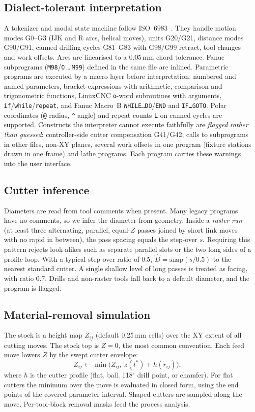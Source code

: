 \documentclass[conference]{IEEEtran}
\begin{document}
\subsection{Dialect-tolerant interpretation}
A tokenizer and modal state machine follow ISO~6983~\cite{iso6983}. They handle
motion modes G0--G3 (IJK and R arcs, helical moves), units G20/G21, distance
modes G90/G91, canned drilling cycles G81--G83 with G98/G99 retract, tool
changes and work offsets. Arcs are linearised to a 0.05\,mm chord tolerance.
Fanuc subprograms (\texttt{M98}/\texttt{O}\,\dots\,\texttt{M99}) defined in
the same file are inlined. Parametric programs are executed by a macro layer
before interpretation: numbered and named parameters, bracket expressions with
arithmetic, comparison and trigonometric functions, LinuxCNC \texttt{o}-word
subroutines with arguments, \texttt{if}/\texttt{while}/\texttt{repeat}, and
Fanuc Macro~B \texttt{WHILE\dots DO}/\texttt{END} and \texttt{IF\dots GOTO}.
Polar coordinates (\texttt{@} radius, \texttt{\^{}} angle) and repeat counts
\texttt{L} on canned cycles are supported. Constructs the interpreter cannot
execute faithfully are \emph{flagged rather than guessed}: controller-side
cutter compensation G41/G42, calls to subprograms in other files, non-XY
planes, several work offsets in one program (fixture stations drawn in one
frame) and lathe programs. Each program carries these warnings into the user
interface.

\subsection{Cutter inference}
Diameters are read from tool comments when present. Many legacy programs have
no comments, so we infer the diameter from geometry. Inside a \emph{raster run}
(at least three alternating, parallel, equal-$Z$ passes joined by short link
moves with no rapid in between), the pass spacing equals the step-over $s$.
Requiring this pattern rejects look-alikes such as separate parallel slots or
the two long sides of a profile loop. With a typical step-over ratio of 0.5,
$\hat D = \mathrm{snap}(s/0.5)$ to the nearest standard cutter. A single
shallow level of long passes is treated as facing, with ratio 0.7. Drills and
non-raster tools fall back to a default diameter, and the program is flagged.

\subsection{Material-removal simulation}
The stock is a height map $Z_{ij}$ (default 0.25\,mm cells) over the XY
extent of all cutting moves. The stock top is $Z{=}0$, the most common
convention. Each feed move lowers $Z$ by the swept cutter envelope:
\begin{equation}
Z_{ij} \leftarrow \min\!\big(Z_{ij},\ z(t^\ast) + h(r_{ij})\big),
\end{equation}
where $h$ is the cutter profile (flat, ball, 118$^\circ$ drill point, or
chamfer). For flat cutters the minimum over the move is evaluated in closed
form, using the end points of the covered parameter interval. Shaped cutters
are sampled along the move. Per-tool-block removal masks feed the process analysis.
\end{document}
